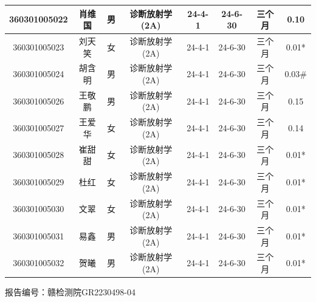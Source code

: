 \begin{table}[H]
\begin{tabular}{|c|c|c|c|c|c|c|c|}
\hline
360301005022 & 肖维国 & 男 & 诊断放射学(2A) & 24-4-1 & 24-6-30 & 三个月 & 0.10 \\
\hline
360301005023 & 刘天笑 & 女 & 诊断放射学(2A) & 24-4-1 & 24-6-30 & 三个月 & 0.01* \\
\hline
360301005024 & 胡含明 & 男 & 诊断放射学(2A) & 24-4-1 & 24-6-30 & 三个月 & 0.03\# \\
\hline
360301005026 & 王敬鹏 & 男 & 诊断放射学(2A) & 24-4-1 & 24-6-30 & 三个月 & 0.15 \\
\hline
360301005027 & 王爱华 & 女 & 诊断放射学(2A) & 24-4-1 & 24-6-30 & 三个月 & 0.14 \\
\hline
360301005028 & 崔甜甜 & 女 & 诊断放射学(2A) & 24-4-1 & 24-6-30 & 三个月 & 0.01* \\
\hline
360301005029 & 杜红 & 女 & 诊断放射学(2A) & 24-4-1 & 24-6-30 & 三个月 & 0.01* \\
\hline
360301005030 & 文翠 & 女 & 诊断放射学(2A) & 24-4-1 & 24-6-30 & 三个月 & 0.01* \\
\hline
360301005031 & 易鑫 & 男 & 诊断放射学(2A) & 24-4-1 & 24-6-30 & 三个月 & 0.01* \\
\hline
360301005032 & 贺曦 & 男 & 诊断放射学(2A) & 24-4-1 & 24-6-30 & 三个月 & 0.01* \\
\hline
\end{tabular}
\end{table}


报告编号：赣检测院GR2230498-04


